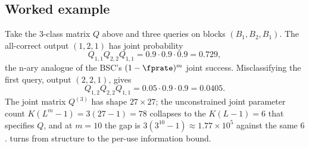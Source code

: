 \subsection*{Worked example}

Take the 3-class matrix $Q$ above and three queries on blocks $(B_1, B_2, B_1)$.
The all-correct output $(1, 2, 1)$ has joint probability
\[
  Q_{1,1} Q_{2,2} Q_{1,1} = 0.9 \cdot 0.9 \cdot 0.9 = 0.729,
\]
the n-ary analogue of the BSC's $(1 - \fprate)^m$ joint success. Misclassifying
the first query, output $(2, 2, 1)$, gives
\[
  Q_{1,2} Q_{2,2} Q_{1,1} = 0.05 \cdot 0.9 \cdot 0.9 = 0.0405.
\]
The joint matrix $Q^{(3)}$ has shape $27 \times 27$; the unconstrained joint
parameter count $K(L^m - 1) = 3(27 - 1) = 78$ collapses to the $K(L-1) = 6$ that
specifies $Q$, and at $m = 10$ the gap is $3(3^{10}-1) \approx 1.77 \times 10^5$
against the same $6$.  turns from structure to the
per-use information bound.
